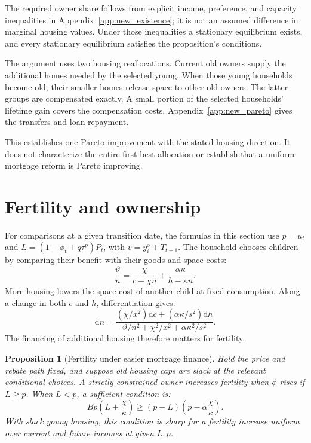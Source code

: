 \documentclass[11pt]{article}
\newtheorem{proposition}{Proposition}
\newcommand{\dd}{\mathrm d}
\begin{document}
The required owner share follows from explicit income, preference, and
capacity inequalities in Appendix~\ref{app:new_existence}; it is not an
assumed difference in marginal housing values. Under those inequalities a
stationary equilibrium exists, and every stationary equilibrium satisfies the
proposition's conditions.

The argument uses two housing reallocations. Current old owners supply the
additional homes needed by the selected young. When those young households
become old, their smaller homes release space to other old owners. The latter
groups are compensated exactly. A small portion of the selected households'
lifetime gain covers the compensation costs. Appendix~\ref{app:new_pareto}
gives the transfers and loan repayment.

This establishes one Pareto improvement with the stated housing direction.
It does not characterize the entire first-best allocation or establish that
a uniform mortgage reform is Pareto improving.

\section{Fertility and ownership}

For comparisons at a given transition date, the formulas in this section use
$p=u_t$ and $L=(1-\phi_t+q\tau^p)P_t$, with $v=y_i^o+T_{t+1}$.
The household chooses children by comparing their benefit with their goods
and space costs:
\begin{equation}
\frac{\vartheta}{n}
=\frac\chi{c-\chi n}+\frac{\alpha\kappa}{h-\kappa n}.
\label{eq:new_fertility}
\end{equation}
More housing lowers the space cost of another child at fixed consumption.
Along a change in both $c$ and $h$, differentiation gives:
\begin{equation}
\dd n=
\frac{(\chi/x^2)\dd c+(\alpha\kappa/s^2)\dd h}
{\vartheta/n^2+\chi^2/x^2+\alpha\kappa^2/s^2}.
\label{eq:new_fertility_differential}
\end{equation}
The financing of additional housing therefore matters for fertility.

\begin{proposition}[Fertility under easier mortgage finance]
Hold the price and rebate path fixed, and suppose old housing caps are slack
at the relevant conditional choices. A strictly constrained owner increases
fertility when $\phi$ rises if $L\ge p$. When $L<p$, a sufficient condition is:
\begin{equation}
\boxed{\quad
Bp\left(L+\frac\chi\kappa\right)
\ge(p-L)\left(p-\alpha\frac\chi\kappa\right).
\quad}
\label{eq:new_fertility_condition}
\end{equation}
With slack young housing, this condition is sharp for a fertility increase
uniform over current and future incomes at given $L,p$.
\label{prop:new_fertility}
\end{proposition}
\end{document}
